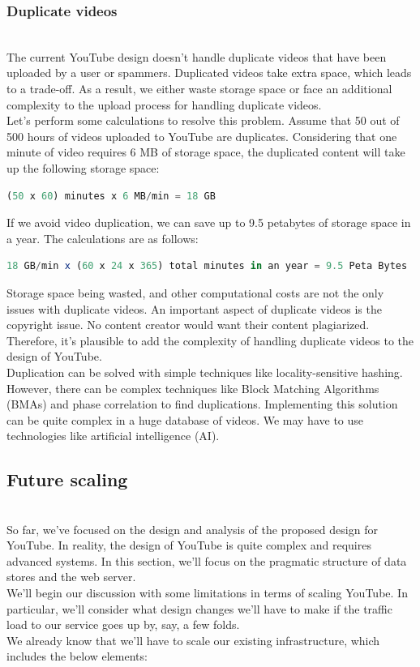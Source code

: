 \subsubsection{Duplicate videos}\label{igwDxzVTRjRH3YjEaBGsw}
\\
The current YouTube design doesn't handle duplicate videos that have been uploaded by a user or spammers. Duplicated videos take extra space, which leads to a trade-off. As a result, we either waste storage space or face an additional complexity to the upload process for handling duplicate videos.
\\
Let's perform some calculations to resolve this problem. Assume that 50 out of 500 hours of videos uploaded to YouTube are duplicates. Considering that one minute of video requires 6 MB of storage space, the duplicated content will take up the following storage space:

\begin{lstlisting}[language=JavaScript]
(50 x 60) minutes x 6 MB/min = 18 GB
\end{lstlisting}

If we avoid video duplication, we can save up to 9.5 petabytes of storage space in a year. The calculations are as follows:

\begin{lstlisting}[language=JavaScript]
18 GB/min x (60 x 24 x 365) total minutes in an year = 9.5 Peta Bytes
\end{lstlisting}

Storage space being wasted, and other computational costs are not the only issues with duplicate videos. An important aspect of duplicate videos is the copyright issue. No content creator would want their content plagiarized. Therefore, it's plausible to add the complexity of handling duplicate videos to the design of YouTube.
\\
Duplication can be solved with simple techniques like locality-sensitive hashing. However, there can be complex techniques like Block Matching Algorithms (BMAs) and phase correlation to find duplications. Implementing this solution can be quite complex in a huge database of videos. We may have to use technologies like artificial intelligence (AI).

\subsection{Future scaling}\label{DUSt7xwZfnYcXt0x6sWHl}
\\
So far, we've focused on the design and analysis of the proposed design for YouTube. In reality, the design of YouTube is quite complex and requires advanced systems. In this section, we'll focus on the pragmatic structure of data stores and the web server.
\\
We'll begin our discussion with some limitations in terms of scaling YouTube. In particular, we'll consider what design changes we'll have to make if the traffic load to our service goes up by, say, a few folds.
\\
We already know that we'll have to scale our existing infrastructure, which includes the below elements:

